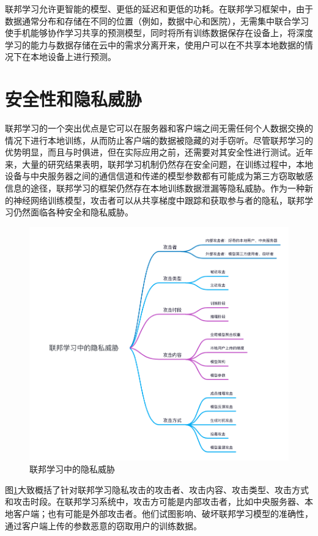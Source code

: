 联邦学习允许更智能的模型、更低的延迟和更低的功耗。在联邦学习框架中，由于数据通常分布和存储在不同的位置（例如，数据中心和医院），无需集中联合学习使手机能够协作学习共享的预测模型，同时将所有训练数据保存在设备上，将深度学习的能力与数据存储在云中的需求分离开来，使用户可以在不共享本地数据的情况下在本地设备上进行预测。

\section{安全性和隐私威胁}
联邦学习的一个突出优点是它可以在服务器和客户端之间无需任何个人数据交换的情况下进行本地训练，从而防止客户端的数据被隐藏的对手窃听。尽管联邦学习的优势明显，而且与时俱进，但在实际应用之前，还需要对其安全性进行测试。近年来，大量的研究结果表明，联邦学习机制仍然存在安全问题，在训练过程中，本地设备与中央服务器之间的通信信道和传递的模型参数都有可能成为第三方窃取敏感信息的途径，联邦学习的框架仍然存在本地训练数据泄漏等隐私威胁。作为一种新的神经网络训练模型，攻击者可以从共享梯度中跟踪和获取参与者的隐私，联邦学习仍然面临各种安全和隐私威胁。

\begin{figure}[!hbt]
\centering
	\includegraphics[scale=0.4]{fig2/C1/联邦学习中的隐私威胁}%
	\caption{联邦学习中的隐私威胁}
	\label{fig:联邦学习中的隐私威胁}	
\end{figure}

图\ref{fig:联邦学习中的隐私威胁}大致概括了针对联邦学习隐私攻击的攻击者、攻击内容、攻击类型、攻击方式和攻击时段。在联邦学习系统中，攻击方可能是内部攻击者，比如中央服务器、本地客户端；也有可能是外部攻击者。他们试图影响、破坏联邦学习模型的准确性，通过客户端上传的参数恶意的窃取用户的训练数据。


